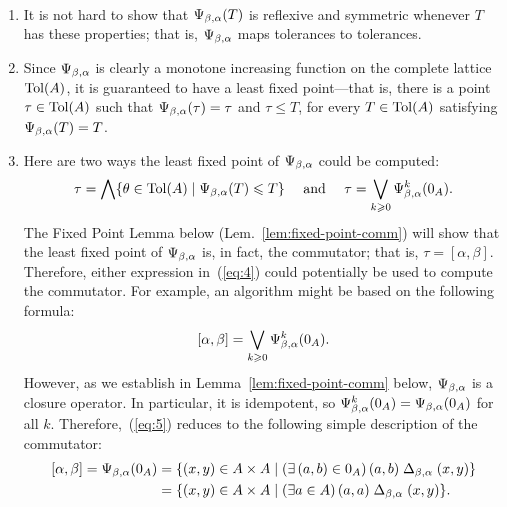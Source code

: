 \begin{remarks}\
  \begin{enumerate}
\item
  It is not hard to show that $\Psi_{\beta, \alpha} (T)$ is reflexive and symmetric
  whenever $T$ has these properties; that is, $\Psi_{\beta, \alpha}$ maps tolerances
  to tolerances.
  \item 
  Since $\Psi_{\beta, \alpha}$ is clearly a monotone increasing function on the complete
  lattice $\operatorname{Tol}(A)$, it is guaranteed to have a least fixed
  point---that is, there is a point $\tau\in \operatorname{Tol}(A)$ such that $\Psi_{\beta, \alpha}(\tau) = \tau$
  and $\tau \leq T$, for every $T \in \operatorname{Tol}(A)$
  satisfying $\Psi_{\beta, \alpha}(T) = T$.
\item
  Here are two ways the least fixed point of $\Psi_{\beta, \alpha}$ could be computed:
  \begin{equation}
    \label{eq:4}
  \tau = \Meet \{ \theta \in \Tol(A) \mid \Psiba(T) \leq T\}
  \quad \text{ and } \quad
     \tau = \Join_{k\geq 0} \Psiba^{k}(0_A).
  \end{equation}
  The Fixed Point Lemma below (Lem.~\ref{lem:fixed-point-comm})
  will show that the least
  fixed point of $\Psi_{\beta, \alpha}$ is, in fact, the commutator;
  that is, $\tau = [\alpha, \beta]$.  Therefore, either
  expression in~(\ref{eq:4}) could potentially be used to compute the
  commutator. For example,
  an algorithm might be based on the following formula:
  \begin{equation}
    \label{eq:5}
          [\alpha, \beta] = \Join_{k\geq 0} \Psiba^{k}(0_A).
  \end{equation}
  However, as we establish in Lemma~\ref{lem:fixed-point-comm} below,
  $\Psi_{\beta, \alpha}$ is a closure operator. In particular, it is idempotent, so 
  $\Psi_{\beta, \alpha}^{k}(0_A) = \Psi_{\beta, \alpha}(0_A)$ for all $k$. Therefore,~(\ref{eq:5}) reduces
  to the following simple description of the commutator:
  \begin{align*}
          [\alpha, \beta] =
          \Psi_{\beta, \alpha}(0_A)
          &= \{ (x,y) \in A\times A \mid
          (\exists\, (a,b) \in 0_A)\, (a,b) \mathrel{\Delta_{\beta, \alpha}} (x,y)\}\\
          &= \{ (x,y) \in A\times A \mid
          (\exists a \in A)\, (a,a) \mathrel{\Delta_{\beta, \alpha}} (x,y)\}.
  \end{align*}


  \end{enumerate}
\end{remarks}



